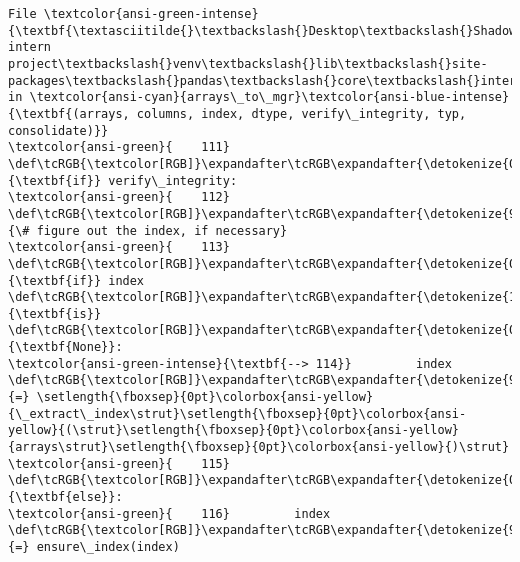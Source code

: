 \documentclass[11pt]{article}
\begin{document}
\begin{Verbatim}[commandchars=\\\{\}, frame=single, framerule=2mm, rulecolor=\color{outerrorbackground}]
File \textcolor{ansi-green-intense}{\textbf{\textasciitilde{}\textbackslash{}Desktop\textbackslash{}Shadowfox intern project\textbackslash{}venv\textbackslash{}lib\textbackslash{}site-packages\textbackslash{}pandas\textbackslash{}core\textbackslash{}internals\textbackslash{}construction.py:114}}, in \textcolor{ansi-cyan}{arrays\_to\_mgr}\textcolor{ansi-blue-intense}{\textbf{(arrays, columns, index, dtype, verify\_integrity, typ, consolidate)}}
\textcolor{ansi-green}{    111} \def\tcRGB{\textcolor[RGB]}\expandafter\tcRGB\expandafter{\detokenize{0,135,0}}{\textbf{if}} verify\_integrity:
\textcolor{ansi-green}{    112}     \def\tcRGB{\textcolor[RGB]}\expandafter\tcRGB\expandafter{\detokenize{95,135,135}}{\# figure out the index, if necessary}
\textcolor{ansi-green}{    113}     \def\tcRGB{\textcolor[RGB]}\expandafter\tcRGB\expandafter{\detokenize{0,135,0}}{\textbf{if}} index \def\tcRGB{\textcolor[RGB]}\expandafter\tcRGB\expandafter{\detokenize{175,0,255}}{\textbf{is}} \def\tcRGB{\textcolor[RGB]}\expandafter\tcRGB\expandafter{\detokenize{0,135,0}}{\textbf{None}}:
\textcolor{ansi-green-intense}{\textbf{--> 114}}         index \def\tcRGB{\textcolor[RGB]}\expandafter\tcRGB\expandafter{\detokenize{98,98,98}}{=} \setlength{\fboxsep}{0pt}\colorbox{ansi-yellow}{\_extract\_index\strut}\setlength{\fboxsep}{0pt}\colorbox{ansi-yellow}{(\strut}\setlength{\fboxsep}{0pt}\colorbox{ansi-yellow}{arrays\strut}\setlength{\fboxsep}{0pt}\colorbox{ansi-yellow}{)\strut}
\textcolor{ansi-green}{    115}     \def\tcRGB{\textcolor[RGB]}\expandafter\tcRGB\expandafter{\detokenize{0,135,0}}{\textbf{else}}:
\textcolor{ansi-green}{    116}         index \def\tcRGB{\textcolor[RGB]}\expandafter\tcRGB\expandafter{\detokenize{98,98,98}}{=} ensure\_index(index)


\end{Verbatim}
\end{document}
